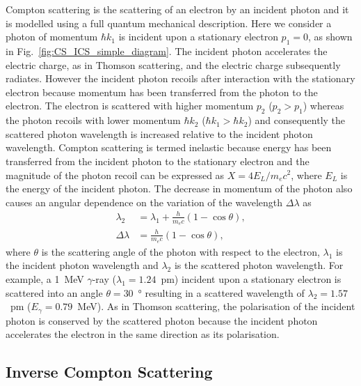 \documentclass[../main.tex]{subfiles}
\begin{document}
Compton scattering \cite{compton1923quantum} is the scattering of an electron by an incident photon and it is modelled using a full quantum mechanical description.
Here we consider a photon of momentum $\hbar k_{1}$ is incident upon a stationary electron $p_{1} = 0$, as shown in Fig.~\ref{fig:CS_ICS_simple_diagram}. The incident photon accelerates the electric charge, as in Thomson scattering, and the electric charge subsequently radiates. However the incident photon recoils after interaction with the stationary electron because momentum has been transferred from the photon to the electron. The electron is scattered with higher momentum $p_{2}$ ($p_{2}>p_{1}$) whereas the photon recoils with lower momentum $\hbar k_{2}$ ($\hbar k_{1} > \hbar k_{2}$) and consequently the scattered photon wavelength is increased relative to the incident photon wavelength. Compton scattering is termed inelastic because energy has been transferred from the incident photon to the stationary electron and the magnitude of the photon recoil can be expressed as $X=4E_{L}/m_{e}c^{2}$, where $E_{L}$ is the energy of the incident photon. The decrease in momentum of the photon also causes an angular dependence on the variation of the wavelength $\Delta\lambda$ as
\begin{align}
\lambda_{2} &= \lambda_{1} + \frac{h}{m_{e}c}\left(1-\cos\theta\right), \\
\Delta\lambda &= \frac{h}{m_{e}c}\left(1-\cos\theta\right),
\label{eq:Compton_wavelength}    
\end{align}
where $\theta$ is the scattering angle of the photon with respect to the electron, $\lambda_{1}$ is the incident photon wavelength and $\lambda_{2}$ is the scattered photon wavelength. For example, a 1~\si{\mega\electronvolt} $\gamma$-ray ($\lambda_{1} = 1.24$~\si{\pico\meter}) incident upon a stationary electron is scattered into an angle $\theta = 30$~\si{\degree} resulting in a scattered wavelength of $\lambda_{2} = 1.57$~\si{\pico\meter} ($E_{\gamma} = 0.79$~\si{\mega\electronvolt}). As in Thomson scattering, the polarisation of the incident photon is conserved by the scattered photon because the incident photon accelerates the electron in the same direction as its polarisation.

\subsection{Inverse Compton Scattering}
\end{document}
